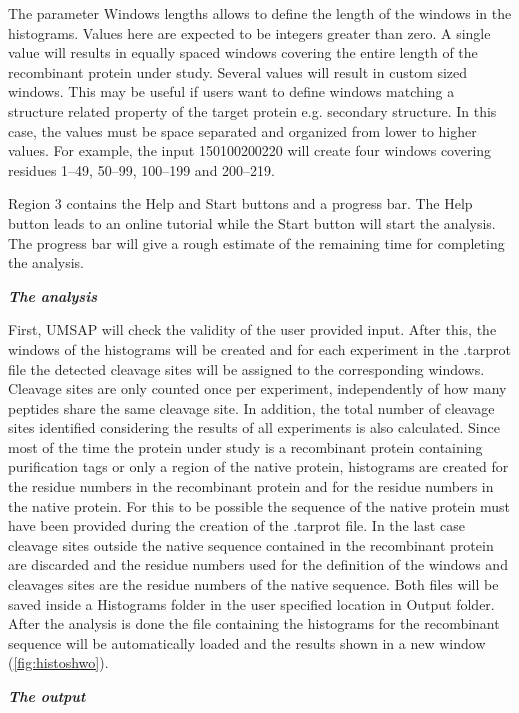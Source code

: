The parameter Windows lengths allows to define the length of the windows in the histograms. Values here are expected to be integers greater than zero. A single value will results in equally spaced windows covering the entire length of the recombinant protein under study. Several values will result in custom sized windows. This may be useful if users want to define windows matching a structure related property of the target protein e.g. secondary structure. In this case, the values must be space separated and organized from lower to higher values. For example, the input \numlist{1 50 100 200 220} will create four windows covering residues \numrange{1}{49}, \numrange{50}{99}, \numrange{100}{199} and \numrange{200}{219}.

Region \num{3} contains the Help and Start buttons and a progress bar. The Help button leads to an online tutorial while the Start button will start the analysis. The progress bar will give a rough estimate of the remaining time for completing the analysis.

\textit{\textbf{The analysis}}

First, UMSAP will check the validity of the user provided input. After this, the windows of the histograms will be created and for each experiment in the .tarprot file the detected cleavage sites will be assigned to the corresponding windows. Cleavage sites are only counted once per experiment, independently of how many peptides share the same cleavage site. In addition, the total number of cleavage sites identified considering the results of all experiments is also calculated. Since most of the time the protein under study is a recombinant protein containing purification tags or only a region of the native protein, histograms are created for the residue numbers in the recombinant protein and for the residue numbers in the native protein. For this to be possible the sequence of the native protein must have been provided during the creation of the .tarprot file. In the last case cleavage sites outside the native sequence contained in the recombinant protein are discarded and the residue numbers used for the definition of the windows and cleavages sites are the residue numbers of the native sequence. Both files will be saved inside a Histograms folder in the user specified location in Output folder. After the analysis is done the file containing the histograms for the recombinant sequence will be automatically loaded and the results shown in a new window (\autoref{fig:histoshwo}).

\textit{\textbf{The output}}

